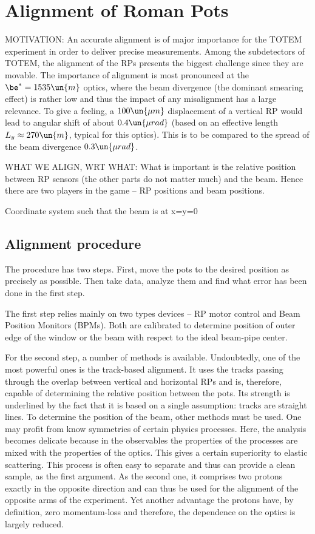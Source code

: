 \chapter[al]{Alignment of Roman Pots}


MOTIVATION: An accurate alignment is of major importance for the TOTEM experiment in order to deliver precise measurements. Among the subdetectors of TOTEM, the alignment of the RPs presents the biggest challenge since they are movable. The importance of alignment is most pronounced at the $\be^* = 1535\un{m}$ optics, where the beam divergence (the dominant smearing effect) is rather low and thus the impact of any misalignment has a large relevance. To give a feeling, a $100\un{\mu m}$ displacement of a vertical RP would lead to angular shift of about $0.4\un{\mu rad}$ (based on an effective length $L_y\approx 270\un{m}$, typical for this optics). This is to be compared to the spread of the beam divergence $0.3\un{\mu rad}$.


WHAT WE ALIGN, WRT WHAT:
What is important is the relative position between RP sensors (the other parts do not matter much) and the beam. Hence there are two players in the game -- RP positions and beam positions.

Coordinate system such that the beam is at x=y=0

\section[al proc]{Alignment procedure}
The procedure has two steps. First, move the pots to the desired position as precisely as possible. Then take data, analyze them and find what error has been done in the first step.

The first step relies mainly on two types devices -- RP motor control and Beam Position Monitors (BPMs). Both are calibrated to determine position of outer edge of the window or the beam with respect to the ideal beam-pipe center.

For the second step, a number of methods is available. Undoubtedly, one of the most powerful ones is the track-based alignment. It uses the tracks passing through the overlap between vertical and horizontal RPs and is, therefore, capable of determining the relative position between the pots. Its strength is underlined by the fact that it is based on a single assumption: tracks are straight lines. To determine the position of the beam, other methods must be used. One may profit from know symmetries of certain physics processes. Here, the analysis becomes delicate because in the observables the properties of the processes are mixed with the properties of the optics. This gives a certain superiority to elastic scattering. This process is often easy to separate and thus can provide a clean sample, as the first argument. As the second one, it comprises two protons exactly in the opposite direction and can thus be used for the alignment of the opposite arms of the experiment. Yet another advantage the protons have, by definition, zero momentum-loss and therefore, the dependence on the optics is largely reduced.

